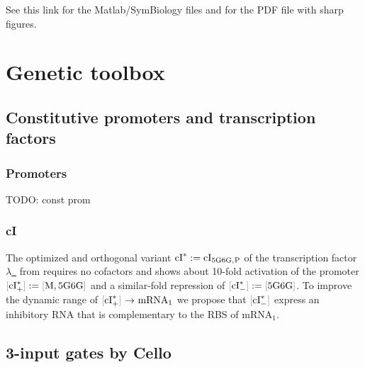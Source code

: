 \documentclass[12pt,notitlepage]{article}
\newcommand{\TODO}[1]{\textrm{\color{red}TODO: #1}}
\newcommand{\cbra}[1]{{\ensuremath{\color{gray}{#1}}}}
\newcommand{\promoter}[1]{{{\cbra{[}\ce{#1}\cbra{]}}}}
\newcommand{\act}{\ {\ensuremath{\mathbin{\to}}}\ }
\newcommand{\ra}[1]{{\color{Blue}#1}}
\begin{document}
See this link 
for the Matlab/SymBiology files
and 
for the PDF file with sharp figures.


\section{Genetic toolbox} \label{s:genetic}


\subsection{Constitutive promoters and transcription factors} \label{ss:const}

\subsubsection*{Promoters} \label{ss:Pc}

\cite{ShimadaETAL2014}
\TODO{const prom}

\subsubsection*{cI} \label{ss:cI}

\ra{
The optimized and orthogonal variant
$\ce{cI^*} := \ce{cI_{5G6G,P}}$
of the transcription factor 
\href{https://www.uniprot.org/uniprot/P03034}{$\lambda$~\ce{cI}}
from
\cite[\href{https://www.nature.com/articles/ncomms13858/figures/4}{Fig.~4c/d}]{BroedelJaramilloIsalan2016}
requires no cofactors
and
shows 
about 10-fold activation of the promoter
$\promoter{cI^*_+} := \promoter{M,{5G6G}}$
and 
a similar-fold repression of 
$\promoter{cI^*_-} := \promoter{{5G6G}}$.
%
%
To improve the dynamic range of 
$\promoter{cI^*_+} \act \text{mRNA}_1$
we propose 
that
$\promoter{cI^*_-}$ express
an inhibitory RNA that is complementary
to the RBS of $\text{mRNA}_1$.
}




\subsection{3-input gates by Cello} \label{ss:cello}
\end{document}
